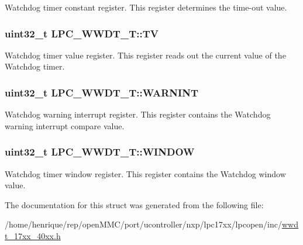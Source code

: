 Watchdog timer constant register. This register determines the time-\/out value. \hypertarget{structLPC__WWDT__T_a8257032e074282d5242e1d2a07537db1}{
\subsubsection[{T\-V}]{ uint32\-\_\-t L\-P\-C\-\_\-\-W\-W\-D\-T\-\_\-\-T\-::\-T\-V}}\label{structLPC__WWDT__T_a8257032e074282d5242e1d2a07537db1}
Watchdog timer value register. This register reads out the current value of the Watchdog timer. \hypertarget{structLPC__WWDT__T_a6efaed3716fc4661ef3a7a52bcc9028a}{
\subsubsection[{W\-A\-R\-N\-I\-N\-T}]{ uint32\-\_\-t L\-P\-C\-\_\-\-W\-W\-D\-T\-\_\-\-T\-::\-W\-A\-R\-N\-I\-N\-T}}\label{structLPC__WWDT__T_a6efaed3716fc4661ef3a7a52bcc9028a}
Watchdog warning interrupt register. This register contains the Watchdog warning interrupt compare value. \hypertarget{structLPC__WWDT__T_abcc1eca1d9cc366b693a5333fb75d1e0}{
\subsubsection[{W\-I\-N\-D\-O\-W}]{ uint32\-\_\-t L\-P\-C\-\_\-\-W\-W\-D\-T\-\_\-\-T\-::\-W\-I\-N\-D\-O\-W}}\label{structLPC__WWDT__T_abcc1eca1d9cc366b693a5333fb75d1e0}
Watchdog timer window register. This register contains the Watchdog window value. 

The documentation for this struct was generated from the following file\-:\begin{DoxyCompactItemize}
\item 
/home/henrique/rep/open\-M\-M\-C/port/ucontroller/nxp/lpc17xx/lpcopen/inc/\hyperlink{wwdt__17xx__40xx_8h}{wwdt\-\_\-17xx\-\_\-40xx.\-h}\end{DoxyCompactItemize}
